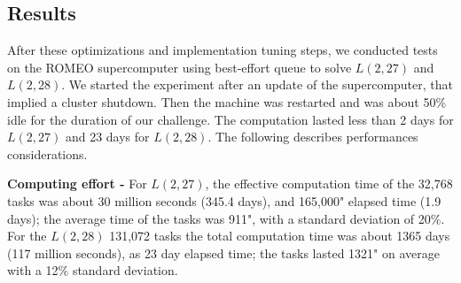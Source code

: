 %



\subsection{Results}
After these optimizations and implementation tuning steps, we conducted tests on the ROMEO supercomputer using best-effort queue to solve $L(2,27)$ and $L(2,28)$. 
We started the experiment after an update of the supercomputer, that implied a cluster shutdown. 
Then the machine was restarted and was about 50\% idle for the duration of our challenge. 
The computation lasted less than 2 days for $L(2,27)$ and 23 days for $L(2,28)$. 
The following describes performances considerations.

\textbf{Computing effort -} 
For $L(2,27)$, the effective computation time of the 32,768 tasks was about 30 million seconds (345.4 days), and 165,000" elapsed time (1.9 days); the average time of the tasks was 911", with a standard deviation of 20\%.
For the $L(2,28)$ 131,072 tasks the total computation time was about 1365 days (117 million seconds), as 23 day elapsed time; the tasks lasted 1321" on average with a 12\% standard deviation.

